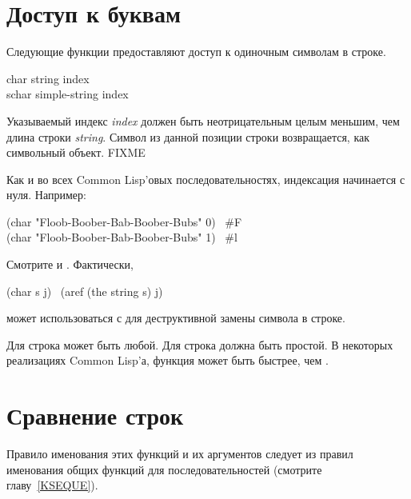 \section{Доступ к буквам}

Следующие функции предоставляют доступ к одиночным символам в строке.

\begin{defun}[Функция]
char string index \\
schar simple-string index

Указываемый индекс \emph{index} должен быть неотрицательным целым меньшим, чем длина
строки \emph{string}. Символ из данной позиции строки возвращается, как символьный
объект. FIXME

Как и во всех Common Lisp'овых последовательностях, индексация начинается с
нуля.
Например:
\begin{lisp}
(char "Floob-Boober-Bab-Boober-Bubs" 0) \EV\ \#{\Xbackslash}F \\
(char "Floob-Boober-Bab-Boober-Bubs" 1) \EV\ \#{\Xbackslash}l
\end{lisp}
Смотрите  и . Фактически, 
\begin{lisp}
(char s j) \EQ\ (aref (the string s) j)
\end{lisp}
 может использоваться с  для деструктивной замены символа в
строке.

Для  строка может быть любой.
Для  строка должна быть простой.
В некоторых реализациях Common Lisp'а, функция  может быть быстрее,
чем .
\end{defun}

\section{Сравнение строк}

Правило именования этих функций и их аргументов следует из правил именования
общих функций для последовательностей (смотрите главу~\ref{KSEQUE}).

